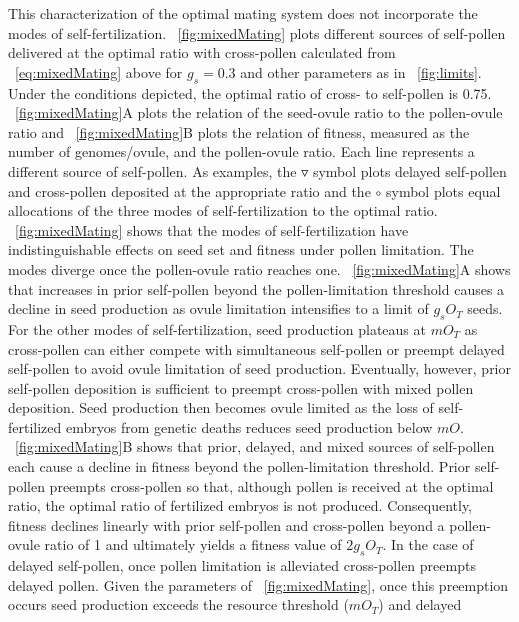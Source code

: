 \documentclass[letterpaper,titlepage]{scrartcl}
\begin{document}
This characterization of the optimal mating system does not
incorporate the modes of
self-fertilization. {\fref}~\ref{fig:mixedMating} plots different
sources of self-pollen delivered at the optimal ratio with
cross-pollen calculated from {\eref}~\ref{eq:mixedMating} above for
$g_{s}=0.3$ and other parameters as in {\fref}~\ref{fig:limits}. Under
the conditions depicted, the optimal ratio of cross- to self-pollen is
0.75. {\fref}~\ref{fig:mixedMating}A plots the relation of the
seed-ovule ratio to the pollen-ovule ratio and
{\fref}~\ref{fig:mixedMating}B plots the relation of fitness, measured
as the number of genomes/ovule, and the pollen-ovule ratio. Each line
represents a different source of self-pollen. As examples, the
$\triangledown$ symbol plots delayed self-pollen and cross-pollen
deposited at the appropriate ratio and the $\circ$ symbol plots equal
allocations of the three modes of self-fertilization to the optimal
ratio. {\fref}~\ref{fig:mixedMating} shows that the modes of
self-fertilization have indistinguishable effects on seed set and
fitness under pollen limitation. The modes diverge once the
pollen-ovule ratio reaches one. {\fref}~\ref{fig:mixedMating}A
shows that increases in prior self-pollen beyond the pollen-limitation
threshold causes a decline in seed production as ovule limitation
intensifies to a limit of $g_{s}O_{T}$ seeds. For the other modes of
self-fertilization, seed production plateaus at $mO_{T}$ as
cross-pollen can either compete with simultaneous self-pollen or
preempt delayed self-pollen to avoid ovule limitation of seed
production. Eventually, however, prior self-pollen deposition is
sufficient to preempt cross-pollen with mixed pollen deposition. Seed
production then becomes ovule limited as the loss of self-fertilized
embryos from genetic deaths reduces seed production below
$mO$. {\fref}~\ref{fig:mixedMating}B shows that prior,
delayed, and mixed sources of self-pollen each cause a decline in
fitness beyond the pollen-limitation threshold. Prior self-pollen
preempts cross-pollen so that, although pollen is received at the
optimal ratio, the optimal ratio of fertilized embryos is not
produced. Consequently, fitness declines linearly with prior
self-pollen and cross-pollen beyond a pollen-ovule ratio of 1 and
ultimately yields a fitness value of $2g_{s}O_{T}$. In the case of
delayed self-pollen, once pollen limitation is alleviated cross-pollen
preempts delayed pollen. Given the parameters of
{\fref}~\ref{fig:mixedMating}, once this preemption occurs seed
production exceeds the resource threshold ($mO_{T}$) and delayed
\end{document}
